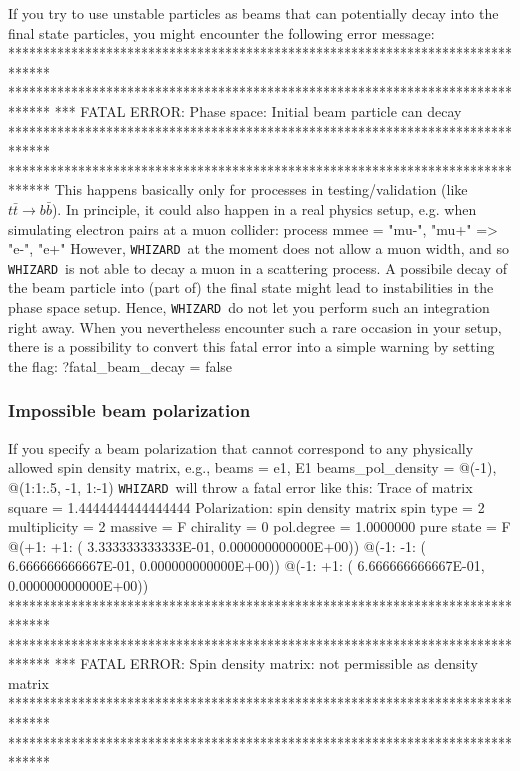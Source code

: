 \documentclass[12pt]{book}
\newenvironment{code}%
  {\begingroup\footnotesize
   \quote
   \Verbatim}%
  {\endVerbatim
   \endquote
   \endgroup\noindent}
\newenvironment{Code}%
  {\begingroup\footnotesize
   \quote
   \Verbatim[frame=single]}%
  {\endVerbatim
   \endquote
   \endgroup\noindent}
\newcommand{\ttt}[1]{\texttt{#1}}
\newcommand{\whizard}{\ttt{WHIZARD}}
\begin{document}
If you try to use unstable particles as beams that can potentially
decay into the final state particles, you might encounter the
following error message:
\begin{Code}
******************************************************************************
******************************************************************************
*** FATAL ERROR:  Phase space: Initial beam particle can decay
******************************************************************************
******************************************************************************
\end{Code}
This happens basically only for  processes in testing/validation (like
$t \bar t \to b \bar b$). In principle, it could also happen in a real
physics setup, e.g. when simulating electron pairs at a muon collider:
\begin{code}
process mmee = "mu-", "mu+" => "e-", "e+"
\end{code}
However, \whizard\ at the moment does not allow a muon width, and so
\whizard\ is not able to decay a muon in a scattering process.
A possibile decay of the beam particle into (part of) the final state
might lead to instabilities in the phase space setup. Hence, \whizard\
do not let you perform such an integration right away. When you
nevertheless encounter such a rare occasion in your setup, there is a
possibility to convert this fatal error into a simple warning by
setting the flag:
\begin{code}
?fatal_beam_decay = false
\end{code}

\subsubsection{Impossible beam polarization}

If you specify a beam polarization that cannot correspond to any
physically allowed spin density matrix, e.g.,
\begin{code}
beams = e1, E1
beams_pol_density = @(-1), @(1:1:.5, -1, 1:-1)
\end{code}
\whizard\ will throw a fatal
error like this:
\begin{Code}
 Trace of matrix square =    1.4444444444444444
 Polarization: spin density matrix
   spin type     = 2
   multiplicity  = 2
   massive       = F
   chirality     = 0
   pol.degree    = 1.0000000
   pure state    = F
   @(+1: +1: ( 3.333333333333E-01, 0.000000000000E+00))
   @(-1: -1: ( 6.666666666667E-01, 0.000000000000E+00))
   @(-1: +1: ( 6.666666666667E-01, 0.000000000000E+00))
******************************************************************************
******************************************************************************
*** FATAL ERROR: Spin density matrix: not permissible as density matrix
******************************************************************************
******************************************************************************
\end{Code}
\end{document}
